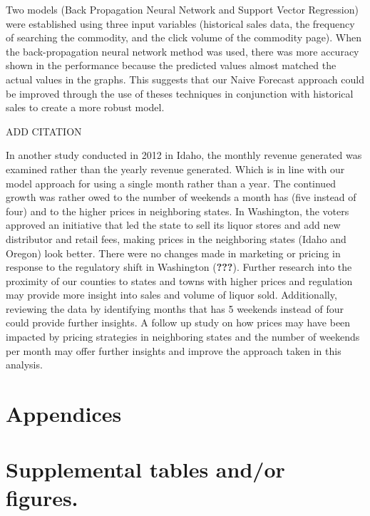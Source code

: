 \documentclass[]{elsarticle} %
\begin{document}
Two models (Back Propagation Neural Network and Support Vector
Regression) were established using three input variables (historical
sales data, the frequency of searching the commodity, and the click
volume of the commodity page). When the back-propagation neural network
method was used, there was more accuracy shown in the performance
because the predicted values almost matched the actual values in the
graphs. This suggests that our Naive Forecast approach could be improved
through the use of theses techniques in conjunction with historical
sales to create a more robust model.

ADD CITATION

In another study conducted in 2012 in Idaho, the monthly revenue
generated was examined rather than the yearly revenue generated. Which
is in line with our model approach for using a single month rather than
a year. The continued growth was rather owed to the number of weekends a
month has (five instead of four) and to the higher prices in neighboring
states. In Washington, the voters approved an initiative that led the
state to sell its liquor stores and add new distributor and retail fees,
making prices in the neighboring states (Idaho and Oregon) look better.
There were no changes made in marketing or pricing in response to the
regulatory shift in Washington ({\textbf{???}}). Further research into
the proximity of our counties to states and towns with higher prices and
regulation may provide more insight into sales and volume of liquor
sold. Additionally, reviewing the data by identifying months that has 5
weekends instead of four could provide further insights. A follow up
study on how prices may have been impacted by pricing strategies in
neighboring states and the number of weekends per month may offer
further insights and improve the approach taken in this analysis.

\newpage

\section{Appendices}\label{appendices}

\section{Supplemental tables and/or
figures.}\label{supplemental-tables-andor-figures.}
\end{document}
